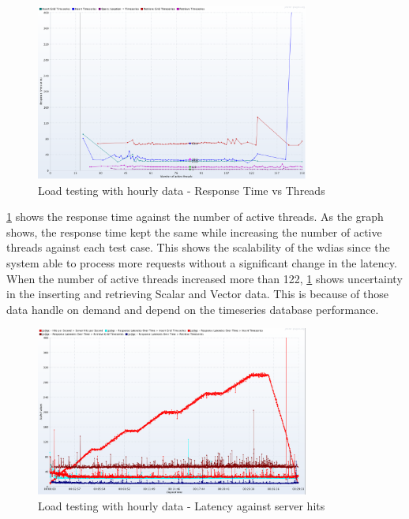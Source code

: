 \begin{figure}[htp]
    \centering
    \includegraphics[width=0.8\textwidth]{results/obs/all/obs_all_60m_response_times_vs_threads.png}
    \caption{Load testing with hourly data - Response Time vs Threads}
    \label{fi:test_obs_all_60m_response_vs_threads}
\end{figure}
\cref{fi:test_obs_all_60m_response_vs_threads} shows the response time against the number of active threads. As the graph shows, the response time kept the same while increasing the number of active threads against each test case. This shows the scalability of the \acrshort{wdias} since the system able to process more requests without a significant change in the latency. When the number of active threads increased more than 122, \cref{fi:test_obs_all_60m_response_vs_threads} shows uncertainty in the inserting and retrieving Scalar and Vector data. This is because of those data handle on demand and depend on the timeseries database performance.

\begin{figure}[htp]
    \centering
    \includegraphics[width=0.8\textwidth]{results/obs/all/obs_all_60m_res_latencies_against_hits.png}
    \caption{Load testing with hourly data - Latency against server hits}
    \label{fi:test_obs_all_60m_latency}
\end{figure}

